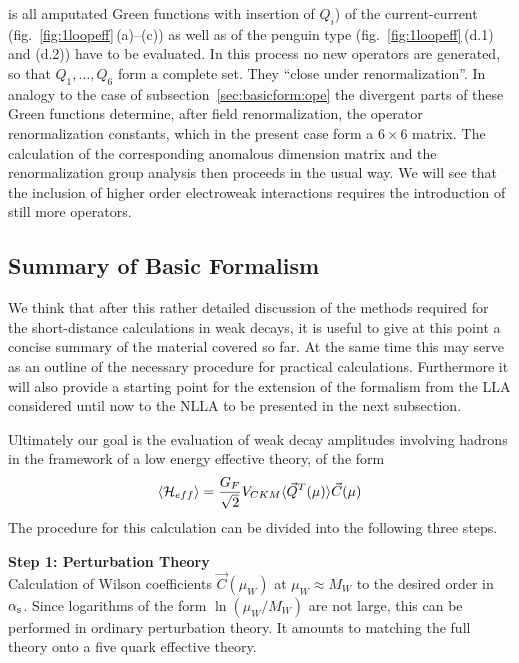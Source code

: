 is all amputated Green functions with insertion of $Q_i$) of the
current-current (fig.\ \ref{fig:1loopeff}\,(a)--(c)) as well as of the
penguin type (fig.\ \ref{fig:1loopeff}\,(d.1) and (d.2)) have to be
evaluated.  In this process no new operators are generated, so that
$Q_1,\ldots, Q_6$ form a complete set. They ``close under
renormalization''. In analogy to the case of
subsection~\ref{sec:basicform:ope} the divergent parts of these Green
functions determine, after field renormalization, the operator
renormalization constants, which in the present case form a $6\times 6$
matrix. The calculation of the corresponding anomalous dimension matrix
and the renormalization group analysis then proceeds in the usual way.
We will see that the inclusion of higher order electroweak interactions
requires the introduction of still more operators.

\subsection{Summary of Basic Formalism}
            \label{sec:basicform:summary}
We think that after this rather detailed discussion of the methods
required for the short-distance calculations in weak decays, it is
useful to give at this point a concise summary of the material
covered so far. At the same time this may serve as an outline of the
necessary procedure for practical calculations. Furthermore it will
also provide a starting point for the extension of the formalism
from the LLA considered until now to the NLLA to be presented
in the next subsection.

Ultimately our goal is the evaluation of weak decay amplitudes
involving hadrons in the framework of a low energy effective theory,
of the form
\begin{displaymath}
\langle {\cal H}_{eff}\rangle={G_F\over\sqrt{2}}V_{CKM}
\langle \vec Q^T(\mu)\rangle \vec C(\mu)
\end{displaymath}
The procedure for this calculation can be divided into the
following three steps.

\bigskip
\noindent
{\bf Step 1: Perturbation Theory}
\\
Calculation of Wilson coefficients $\vec C(\mu_W)$ at
$\mu_W\approx M_W$ to the desired order in $\alpha_{\rm s}$. Since
logarithms of the form $\ln(\mu_W/M_W)$ are not large, this can be
performed in ordinary perturbation theory. It amounts to matching
the full theory onto a five quark effective theory.\\

